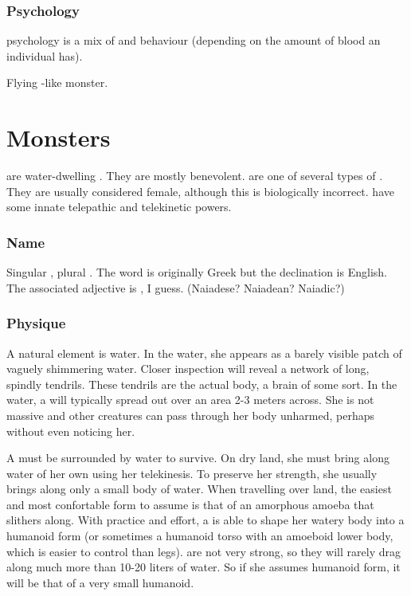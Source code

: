 \subsubsection{Psychology}
\Rachyth{} psychology is a mix of \draconic{} and \scathaese{} behaviour (depending on the amount of \dragon{} blood an individual \rachyth{} has). 



\subsectionn{\Wyvern{}}
Flying \dragon-like monster. 





\newpage
\section{Monsters}



\subsectionn{\Naiad{}}
\label{Naiad}
\Naiads{} are water-dwelling . They are mostly benevolent. \Naiads{} are one of several types of . They are usually considered female, although this is biologically incorrect. \Naiads{} have some innate telepathic and telekinetic powers. 

\subsubsection{Name}
Singular , plural \emph{\naiads{}}. The word is originally Greek but the declination is English. The associated adjective is \emph{\naiad{}}, I guess. (Naiadese? Naiadean? Naiadic?) 

\subsubsection{Physique}
A \naiadz{} natural element is water. In the water, she appears as a barely visible patch of vaguely shimmering water. Closer inspection will reveal a network of long, spindly tendrils. These tendrils are the \naiadz{} actual body, a brain of some sort. In the water, a \naiad{} will typically spread out over an area 2-3 meters across. She is not massive and other creatures can pass through her body unharmed, perhaps without even noticing her. 

A \naiad{} must be surrounded by water to survive. On dry land, she must bring along water of her own using her telekinesis. To preserve her strength, she usually brings along only a small body of water. When travelling over land, the easiest and most confortable form to assume is that of an amorphous amoeba that slithers along. With practice and effort, a \naiad{} is able to shape her watery body into a humanoid form (or sometimes a humanoid torso with an amoeboid lower body, which is easier to control than legs). \Naiads{} are not very strong, so they will rarely drag along much more than 10-20 liters of water. So if she assumes humanoid form, it will be that of a very small humanoid. 

